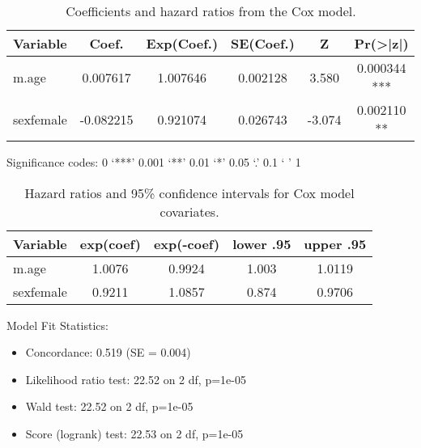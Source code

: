 \documentclass[12pt,letterpaper]{article}
\begin{document}
\begin{table}[H]
	\centering
	\begin{tabular}{lccccc}
		\hline
		Variable & Coef. & Exp(Coef.) & SE(Coef.) & Z & Pr(>|z|) \\
		\hline
		m.age & 0.007617 & 1.007646 & 0.002128 & 3.580 & 0.000344 *** \\
		sexfemale & -0.082215 & 0.921074 & 0.026743 & -3.074 & 0.002110 ** \\
		\hline
	\end{tabular}
	\caption{Coefficients and hazard ratios from the Cox model.}
\end{table}

Significance codes:  0 ‘***’ 0.001 ‘**’ 0.01 ‘*’ 0.05 ‘.’ 0.1 ‘ ’ 1

\begin{table}[H]
	\centering
	\begin{tabular}{lcccc}
		\hline
		Variable & exp(coef) & exp(-coef) & lower .95 & upper .95 \\
		\hline
		m.age & 1.0076 & 0.9924 & 1.003 & 1.0119 \\
		sexfemale & 0.9211 & 1.0857 & 0.874 & 0.9706 \\
		\hline
	\end{tabular}
	\caption{Hazard ratios and 95\% confidence intervals for Cox model covariates.}
\end{table}

Model Fit Statistics:

\begin{itemize}
	\item Concordance: 0.519  (SE = 0.004)
	\item Likelihood ratio test: 22.52 on 2 df, p=1e-05
	\item Wald test: 22.52 on 2 df, p=1e-05
	\item Score (logrank) test: 22.53 on 2 df, p=1e-05
\end{itemize}
\end{document}
